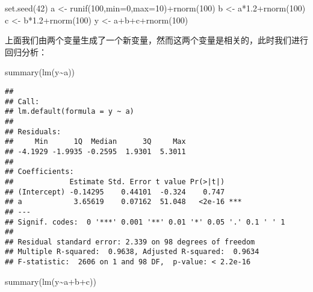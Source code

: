 \documentclass[]{tufte-book}
\newenvironment{Shaded}{}{}
\newcommand{\AttributeTok}[1]{\textcolor[rgb]{0.49,0.56,0.16}{#1}}
\newcommand{\DecValTok}[1]{\textcolor[rgb]{0.25,0.63,0.44}{#1}}
\newcommand{\FloatTok}[1]{\textcolor[rgb]{0.25,0.63,0.44}{#1}}
\newcommand{\FunctionTok}[1]{\textcolor[rgb]{0.02,0.16,0.49}{#1}}
\newcommand{\NormalTok}[1]{#1}
\newcommand{\OtherTok}[1]{\textcolor[rgb]{0.00,0.44,0.13}{#1}}
\newcommand{\SpecialCharTok}[1]{\textcolor[rgb]{0.25,0.44,0.63}{#1}}
\begin{document}
\begin{Shaded}
\begin{Highlighting}[]
\FunctionTok{set.seed}\NormalTok{(}\DecValTok{42}\NormalTok{)}
\NormalTok{a }\OtherTok{\textless{}{-}} \FunctionTok{runif}\NormalTok{(}\DecValTok{100}\NormalTok{,}\AttributeTok{min=}\DecValTok{0}\NormalTok{,}\AttributeTok{max=}\DecValTok{10}\NormalTok{)}\SpecialCharTok{+}\FunctionTok{rnorm}\NormalTok{(}\DecValTok{100}\NormalTok{)}
\NormalTok{b }\OtherTok{\textless{}{-}}\NormalTok{ a}\SpecialCharTok{*}\FloatTok{1.2}\SpecialCharTok{+}\FunctionTok{rnorm}\NormalTok{(}\DecValTok{100}\NormalTok{)}
\NormalTok{c }\OtherTok{\textless{}{-}}\NormalTok{ b}\SpecialCharTok{*}\FloatTok{1.2}\SpecialCharTok{+}\FunctionTok{rnorm}\NormalTok{(}\DecValTok{100}\NormalTok{)}
\NormalTok{y }\OtherTok{\textless{}{-}}\NormalTok{ a}\SpecialCharTok{+}\NormalTok{b}\SpecialCharTok{+}\NormalTok{c}\SpecialCharTok{+}\FunctionTok{rnorm}\NormalTok{(}\DecValTok{100}\NormalTok{)}
\end{Highlighting}
\end{Shaded}

上面我们由两个变量生成了一个新变量，然而这两个变量是相关的，此时我们进行回归分析：

\begin{Shaded}
\begin{Highlighting}[]
\FunctionTok{summary}\NormalTok{(}\FunctionTok{lm}\NormalTok{(y}\SpecialCharTok{\textasciitilde{}}\NormalTok{a))}
\end{Highlighting}
\end{Shaded}

\begin{verbatim}
## 
## Call:
## lm.default(formula = y ~ a)
## 
## Residuals:
##     Min      1Q  Median      3Q     Max 
## -4.1929 -1.9935 -0.2595  1.9301  5.3011 
## 
## Coefficients:
##             Estimate Std. Error t value Pr(>|t|)    
## (Intercept) -0.14295    0.44101  -0.324    0.747    
## a            3.65619    0.07162  51.048   <2e-16 ***
## ---
## Signif. codes:  0 '***' 0.001 '**' 0.01 '*' 0.05 '.' 0.1 ' ' 1
## 
## Residual standard error: 2.339 on 98 degrees of freedom
## Multiple R-squared:  0.9638, Adjusted R-squared:  0.9634 
## F-statistic:  2606 on 1 and 98 DF,  p-value: < 2.2e-16
\end{verbatim}

\begin{Shaded}
\begin{Highlighting}[]
\FunctionTok{summary}\NormalTok{(}\FunctionTok{lm}\NormalTok{(y}\SpecialCharTok{\textasciitilde{}}\NormalTok{a}\SpecialCharTok{+}\NormalTok{b}\SpecialCharTok{+}\NormalTok{c))}
\end{Highlighting}
\end{Shaded}
\end{document}
